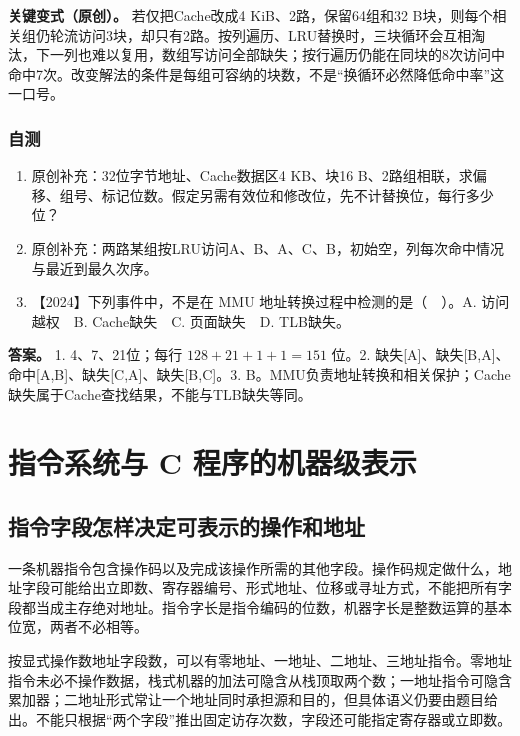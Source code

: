 \textbf{关键变式（原创）。} 若仅把Cache改成4 KiB、2路，保留64组和32 B块，则每个相关组仍轮流访问3块，却只有2路。按列遍历、LRU替换时，三块循环会互相淘汰，下一列也难以复用，数组写访问全部缺失；按行遍历仍能在同块的8次访问中命中7次。改变解法的条件是每组可容纳的块数，不是``换循环必然降低命中率''这一口号。

\subsection{自测}\label{co-self3}

\begin{enumerate}
\def\labelenumi{\arabic{enumi}.}
\tightlist
\item
  原创补充：32位字节地址、Cache数据区4 KB、块16 B、2路组相联，求偏移、组号、标记位数。假定另需有效位和修改位，先不计替换位，每行多少位？
\item
  原创补充：两路某组按LRU访问A、B、A、C、B，初始空，列每次命中情况与最近到最久次序。
\item
  【2024】下列事件中，不是在 MMU 地址转换过程中检测的是（　）。A. 访问越权　B. Cache缺失　C. 页面缺失　D. TLB缺失。
\end{enumerate}

\textbf{答案。} 1. 4、7、21位；每行 \(128+21+1+1=151\) 位。2. 缺失{[}A{]}、缺失{[}B,A{]}、命中{[}A,B{]}、缺失{[}C,A{]}、缺失{[}B,C{]}。3. B。MMU负责地址转换和相关保护；Cache缺失属于Cache查找结果，不能与TLB缺失等同。

\chapter{指令系统与 C 程序的机器级表示}\label{co-ch4}

\section{指令字段怎样决定可表示的操作和地址}\label{co-04-01}

一条机器指令包含操作码以及完成该操作所需的其他字段。操作码规定做什么，地址字段可能给出立即数、寄存器编号、形式地址、位移或寻址方式，不能把所有字段都当成主存绝对地址。指令字长是指令编码的位数，机器字长是整数运算的基本位宽，两者不必相等。

按显式操作数地址字段数，可以有零地址、一地址、二地址、三地址指令。零地址指令未必不操作数据，栈式机器的加法可隐含从栈顶取两个数；一地址指令可隐含累加器；二地址形式常让一个地址同时承担源和目的，但具体语义仍要由题目给出。不能只根据``两个字段''推出固定访存次数，字段还可能指定寄存器或立即数。

